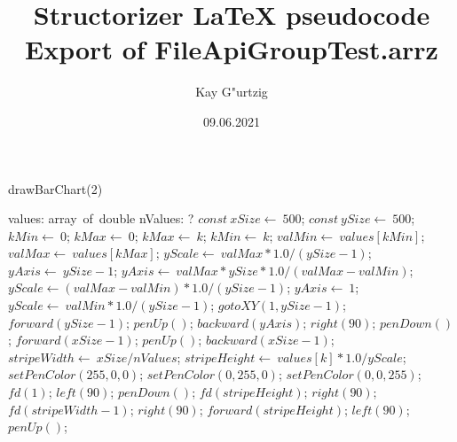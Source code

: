 \documentclass[a4paper,10pt]{article}
\title{Structorizer LaTeX pseudocode Export of FileApiGroupTest.arrz}
\author{Kay G"urtzig}
\date{09.06.2021}
\begin{document}
\begin{algorithm}
\caption{drawBarChart(2)}
\begin{algorithmic}[5]
\State {}
\State {}
\State {}
\State {}
    \State values: array\ of\ double
    \State nValues: ?
  \EndDecl
  \State \(const\ xSize\gets\ 500\);
  \State \(const\ ySize\gets\ 500\);
  \State \(kMin\gets\ 0\);
  \State \(kMax\gets\ 0\);
      \State \(kMax\gets\ k\);
    \Else
        \State \(kMin\gets\ k\);
      \EndIf
    \EndIf
  \EndFor
  \State \(valMin\gets\ values[kMin]\);
  \State \(valMax\gets\ values[kMax]\);
  \State \(yScale\gets\ valMax*1.0/(ySize-1)\);
  \State \(yAxis\gets\ ySize-1\);
      \State \(yAxis\gets\ valMax*ySize*1.0/(valMax-valMin)\);
      \State \(yScale\gets(valMax-valMin)*1.0/(ySize-1)\);
    \Else
      \State \(yAxis\gets\ 1\);
      \State \(yScale\gets\ valMin*1.0/(ySize-1)\);
    \EndIf
  \EndIf
  \State \(gotoXY(1,ySize-1)\);
  \State \(forward(ySize-1)\);
  \State \(penUp()\);
  \State \(backward(yAxis)\);
  \State \(right(90)\);
  \State \(penDown()\);
  \State \(forward(xSize-1)\);
  \State \(penUp()\);
  \State \(backward(xSize-1)\);
  \State \(stripeWidth\gets\ xSize/nValues\);
    \State \(stripeHeight\gets\ values[k]*1.0/yScale\);
        \State \(setPenColor(255,0,0)\);
      \EndSelector
        \State \(setPenColor(0,255,0)\);
      \EndSelector
        \State \(setPenColor(0,0,255)\);
      \EndSelector
    \EndCase
    \State \(fd(1)\);
    \State \(left(90)\);
    \State \(penDown()\);
    \State \(fd(stripeHeight)\);
    \State \(right(90)\);
    \State \(fd(stripeWidth-1)\);
    \State \(right(90)\);
    \State \(forward(stripeHeight)\);
    \State \(left(90)\);
    \State \(penUp()\);
  \EndFor
\EndProcedure
\end{algorithmic}
\end{algorithm}
\end{document}
